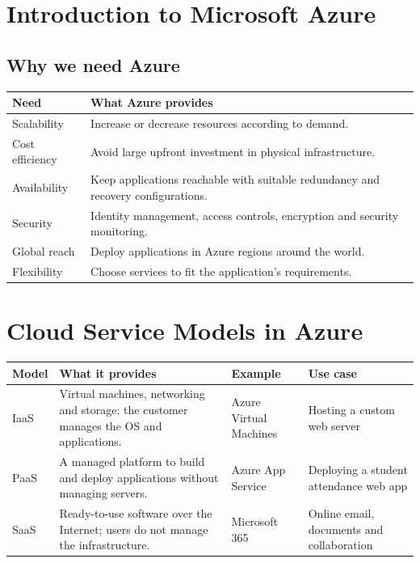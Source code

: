 \documentclass[11pt,a4paper]{article}
\begin{document}
\newpage
{}

\section{Introduction to Microsoft Azure}



\subsection{Why we need Azure}

\begin{tabularx}{\textwidth}{@{}lX@{}}
\toprule
\rowcolor{tablehead}\textbf{Need} & \textbf{What Azure provides} \\
\midrule
Scalability & Increase or decrease resources according to demand. \\
Cost efficiency & Avoid large upfront investment in physical infrastructure. \\
Availability & Keep applications reachable with suitable redundancy and recovery
  configurations. \\
Security & Identity management, access controls, encryption and security monitoring. \\
Global reach & Deploy applications in Azure regions around the world. \\
Flexibility & Choose services to fit the application's requirements. \\
\bottomrule
\end{tabularx}

\section{Cloud Service Models in Azure}

\begin{tabularx}{\textwidth}{@{}lXlX@{}}
\toprule
\rowcolor{tablehead}\textbf{Model} & \textbf{What it provides} & \textbf{Example} &
  \textbf{Use case} \\
\midrule
IaaS & Virtual machines, networking and storage; the customer manages the OS and
  applications. & Azure Virtual Machines & Hosting a custom web server \\
\addlinespace
PaaS & A managed platform to build and deploy applications without managing servers. & Azure
  App Service & Deploying a student attendance web app \\
\addlinespace
SaaS & Ready-to-use software over the Internet; users do not manage the infrastructure. &
  Microsoft 365 & Online email, documents and collaboration \\
\bottomrule
\end{tabularx}
\end{document}
